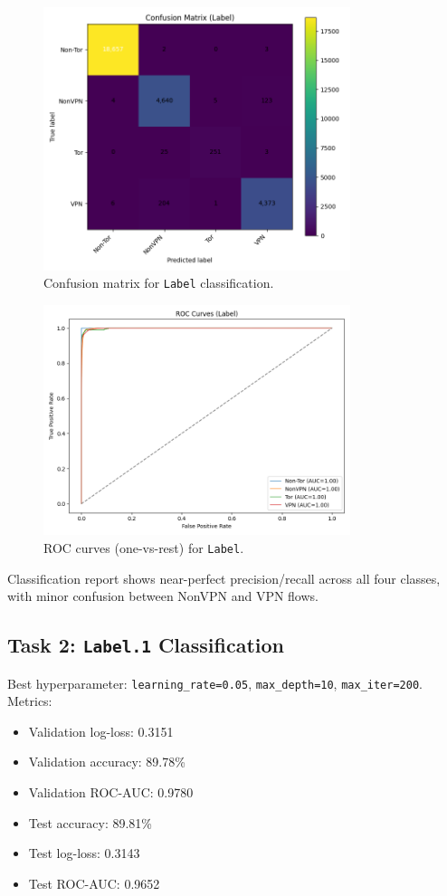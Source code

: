 \documentclass[12pt]{article}
\begin{document}
\begin{figure}[H]
  \centering
  \includegraphics[width=0.8\textwidth]{images/cm_Label.png}
  \caption{Confusion matrix for \texttt{Label} classification.}
  \label{fig:cm_label}
\end{figure}

\begin{figure}[H]
  \centering
  \includegraphics[width=0.8\textwidth]{images/roc_Label.png}
  \caption{ROC curves (one-vs-rest) for \texttt{Label}.}
  \label{fig:roc_label}
\end{figure}

Classification report shows near-perfect precision/recall across all four classes, with minor confusion between NonVPN and VPN flows.

\subsection{Task 2: \texttt{Label.1} Classification}
Best hyperparameter: \texttt{learning\_rate=0.05}, \texttt{max\_depth=10}, \texttt{max\_iter=200}. Metrics:
\begin{itemize}
  \item Validation log-loss: 0.3151
  \item Validation accuracy: 89.78\%
  \item Validation ROC-AUC: 0.9780
  \item Test accuracy: 89.81\%
  \item Test log-loss: 0.3143
  \item Test ROC-AUC: 0.9652
\end{itemize}
\end{document}
